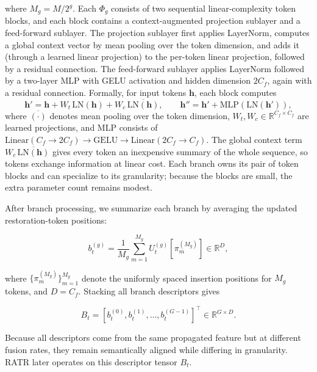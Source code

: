 \documentclass[symmetry,article,submit,pdftex,moreauthors]{Definitions/mdpi}
\begin{document}
where $M_g = M/2^g$. Each $\Phi_g$ consists of two sequential linear-complexity token blocks, and each block contains a context-augmented projection sublayer and a feed-forward sublayer. The projection sublayer first applies LayerNorm, computes a global context vector by mean pooling over the token dimension, and adds it (through a learned linear projection) to the per-token linear projection, followed by a residual connection. The feed-forward sublayer applies LayerNorm followed by a two-layer MLP with GELU activation and hidden dimension $2C_f$, again with a residual connection. Formally, for input tokens $\mathbf{h}$, each block computes
\begin{equation}
\mathbf{h}' = \mathbf{h} + W_t\,\mathrm{LN}(\mathbf{h}) + W_c\,\overline{\mathrm{LN}(\mathbf{h})},\qquad
\mathbf{h}'' = \mathbf{h}' + \mathrm{MLP}(\mathrm{LN}(\mathbf{h}')),
\end{equation}
where $\overline{(\cdot)}$ denotes mean pooling over the token dimension, $W_t,W_c\in\mathbb{R}^{C_f\times C_f}$ are learned projections, and MLP consists of $\mathrm{Linear}(C_f\!\rightarrow\!2C_f)\!\rightarrow\!\mathrm{GELU}\!\rightarrow\!\mathrm{Linear}(2C_f\!\rightarrow\!C_f)$. The global context term $W_c\,\overline{\mathrm{LN}(\mathbf{h})}$ gives every token an inexpensive summary of the whole sequence, so tokens exchange information at linear cost. Each branch owns its pair of token blocks and can specialize to its granularity; because the blocks are small, the extra parameter count remains modest.

After branch processing, we summarize each branch by averaging the updated restoration-token positions:

\begin{equation}
b_t^{(g)} =
\frac{1}{M_g}
\sum_{m=1}^{M_g}
U_t^{(g)}[\pi_m^{(M_g)}]
\in \mathbb{R}^{D},
\end{equation}

where $\{\pi_m^{(M_g)}\}_{m=1}^{M_g}$ denote the uniformly spaced insertion positions for $M_g$ tokens, and $D=C_f$. Stacking all branch descriptors gives

\begin{equation}
B_t =
\left[
b_t^{(0)}, b_t^{(1)}, \ldots, b_t^{(G-1)}
\right]^\top
\in \mathbb{R}^{G \times D}.
\end{equation}

Because all descriptors come from the same propagated feature but at different fusion rates, they remain semantically aligned while differing in granularity. RATR later operates on this descriptor tensor $B_t$.
\end{document}
